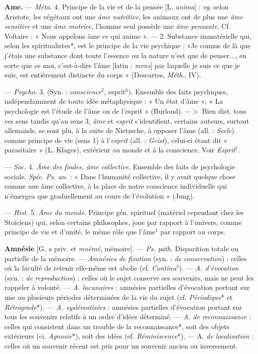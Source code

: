 \begin{itemize}[leftmargin=1cm, label=, itemsep=1pt]
{{{{\item {\bf Ame.} — \textsf{\textit {Méta.}} 4. Principe de la vie et
de la pensée [L. {\it anima}] : {\it vg}. selon
Aristote, les végétaux ont une {\it âme
nutritive}, les animaux ont de plus
une {\it âme sensitive} et une {\it âme motrice},
l’homme seul possède une {\it âme pensante}. Cf. Voltaire : « Nous appelons
âme ce qui anime ». — 2. Substance
immatérielle qui, selon les spiritualistes*,
est le principe de la vie psychique : «Je connus de là que j'étais une
substance dont toute l'essence ou la
nature n’est que de penser..., en sorte
que ce moi, c'est-à-dire l’âme [latin :
{\it mens}] par laquelle je suis ce que
je suis, est entièrement distincte du
corps » (Descartes, {\it Méth}., IV).

— \textsf{\textit {Psycho.}} 3. (Syn. : {\it conscience}$^2$,
esprit$^6$). Ensemble des faits psychiques, indépendamment de toute
idée métaphysique : « Un état
d'âme »; « La psychologie est l'étude
de l'âme ou de l'esprit » (Burloud).
$->$ Bien dist. tous ces sens
tandis qu'au sens 3, {\it âme} et {\it esprit}
s'identifient, certains auteurs, surtout allemands, se sont plu, à la suite
de Nietzsche, à opposer l’âme (all. :
{\it Seele}) comme principe de vie (sens 1)
à l'{\it esprit} (all. : {\it Geist}), celui-ci étant
dit « parasitaire » (L. Klages),
extérieur au monde et à la conscience. Voir {\it Esprit}$^7$.

— \textsf{\textit {Soc.}} 4. {\it Âme des foules, âme
collective}. Ensemble des faits de
psychologie sociale. {\it Spéc}. \textsf{\textit {Ps. an.}} :
« Dans l'humanité collective, il y
avait quelque chose comme une âme
collective, à la place de notre conscience individuelle qui n’émergea
que graduellement au cours de
l'évolution » (Jung).

— \textsf{\textit {Hist.}} 5. {\it Âme du monde}. Principe gén. spirituel (matériel
cependant chez les Stoïciens) qui, selon
certains philosophes, joue par rapport à l'univers, comme principe
de vie et d'unité, le même rôle que
l'âme$^1$ par rapport au corps.

\item {\bf Amnésie} [G. {\it a} priv. et {\it mnêmé}, mémoire]. — \textsf{\textit {Ps. path.}} Disparition
totale ou partielle de la mémoire.
— {\it Amnésies de fixation} (syn. : {\it de
conservation}) : celles où la faculté de
retenir elle-même est abolie (cf. {\it Continu}$^3$).
— {\it A. d'évocation} (syn. : {\it de
reproduction}) : celles où le sujet conserve ses souvenirs, mais ne peut les
rappeler à volonté. — {\it A. lacunaires} :
amnésies partielles d’évocation portant sur une ou plusieurs périodes
déterminées de la vie du sujet (cf.
{\it Périodique}* et {\it Rétrograde}*). — {\it A.
syslématisées} : amnésies partielles
d'évocation portant sur tous les souvenirs relatifs à un ordre d'idées
déterminé. — {\it A. de reconnaissance} :
celles qui consistent dans un trouble
de la reconnaissance*, soit des objets
extérieurs (ci. {\it Agnosie}*), soit des
idées (ef. {\it Réminiscence}*). — A. {\it de
localisation} : celles où un souvenir
récent est pris pour un souvenir
ancien ou inversement.

}}}}
\end{itemize}
